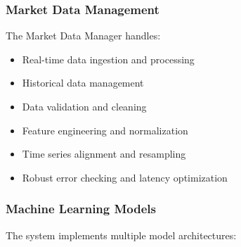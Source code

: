 \documentclass[conference]{IEEEtran}
\begin{document}
\subsubsection{Market Data Management}
The Market Data Manager handles:
\begin{itemize}
    \item Real-time data ingestion and processing
    \item Historical data management
    \item Data validation and cleaning
    \item Feature engineering and normalization
    \item Time series alignment and resampling
    \item Robust error checking and latency optimization
\end{itemize}

\subsubsection{Machine Learning Models}
The system implements multiple model architectures:
\end{document}
